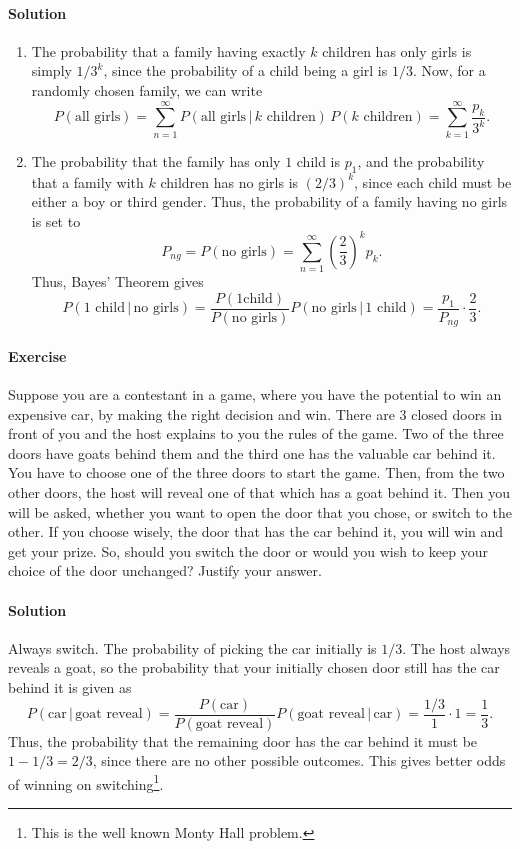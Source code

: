 \documentclass[10pt]{article}
\newcounter{prob}
\def\problem{\stepcounter{prob}\paragraph{Exercise \arabic{prob}}}
\def\solution{\paragraph{Solution}}
\begin{document}
        \solution \begin{enumerate}
            \item The probability that a family having exactly $k$ children has only
            girls is simply $1 / 3^k$, since the probability of a child being a girl
            is $1 / 3$. Now, for a randomly chosen family, we can write \[
                P(\text{all girls}) = \sum_{n = 1}^\infty P(\text{all girls} \,|\,
                k\text{ children})\,P(k\text{ children}) = \sum_{k = 1}^\infty
                \frac{p_k}{3^k}.
            \] 

            \item The probability that the family has only $1$ child is $p_1$, and
            the probability that a family with $k$ children has no girls is $(2 /
            3)^k$, since each child must be either a boy or third gender. Thus, the
            probability of a family having no girls is set to \[
                P_{ng} = P(\text{no girls}) = \sum_{n = 1}^\infty
                \left(\frac{2}{3}\right)^k p_k.
            \] Thus, Bayes' Theorem gives \[
                P(1\text{ child} \,|\, \text{no girls}) = \frac{P(1\text{
                child})}{P(\text{no girls})} P(\text{no girls}\,|\, 1\text{ child})
                = \frac{p_1}{P_{ng}} \cdot \frac{2}{3}.
            \] 
        \end{enumerate}
        
        \problem Suppose you are a contestant in a game, where you have the
        potential to win an expensive car, by making the right decision and win.
        There are 3 closed doors in front of you and the host explains to you the
        rules of the game. Two of the three doors have goats behind them and the
        third one has the valuable car behind it. You have to choose one of the
        three doors to start the game. Then, from the two other doors, the host will
        reveal one of that which has a goat behind it. Then you will be asked,
        whether you want to open the door that you chose, or switch to the other. If
        you choose wisely, the door that has the car behind it, you will win and get
        your prize. So, should you switch the door or would you wish to keep your
        choice of the door unchanged? Justify your answer. 

        \solution Always switch. The probability of picking the car initially is $1
        /3$. The host always reveals a goat, so the probability that your initially
        chosen door still has the car behind it is given as \[
            P(\text{car}\,|\, \text{goat reveal}) =
            \frac{P(\text{car})}{P(\text{goat reveal})} P(\text{goat reveal} \,|\,
            \text{car}) = \frac{1 /3}{1}\cdot 1 = \frac{1}{3}.
        \] Thus, the probability that the remaining door has the car behind it must
        be $1 - 1 /3 = 2 / 3$, since there are no other possible outcomes. This
        gives better odds of winning on switching\footnote{This is the well known
        Monty Hall problem.}. 
\end{document}
